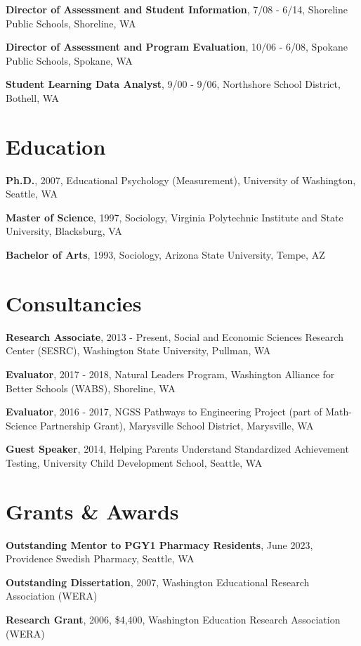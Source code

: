 \documentclass[
  letterpaper,
]{article}
\begin{document}
\textbf{Director of Assessment and Student Information}, 7/08 - 6/14,
Shoreline Public Schools, Shoreline, WA

\textbf{Director of Assessment and Program Evaluation}, 10/06 - 6/08,
Spokane Public Schools, Spokane, WA

\textbf{Student Learning Data Analyst}, 9/00 - 9/06, Northshore School
District, Bothell, WA

\section{Education}\label{education}

\textbf{Ph.D.}, 2007, Educational Psychology (Measurement), University
of Washington, Seattle, WA

\textbf{Master of Science}, 1997, Sociology, Virginia Polytechnic
Institute and State University, Blacksburg, VA

\textbf{Bachelor of Arts}, 1993, Sociology, Arizona State University,
Tempe, AZ

\section{Consultancies}\label{consultancies}

\textbf{Research Associate}, 2013 - Present, Social and Economic
Sciences Research Center (SESRC), Washington State University, Pullman,
WA

\textbf{Evaluator}, 2017 - 2018, Natural Leaders Program, Washington
Alliance for Better Schools (WABS), Shoreline, WA

\textbf{Evaluator}, 2016 - 2017, NGSS Pathways to Engineering Project
(part of Math-Science Partnership Grant), Marysville School District,
Marysville, WA

\textbf{Guest Speaker}, 2014, Helping Parents Understand Standardized
Achievement Testing, University Child Development School, Seattle, WA

\section{Grants \& Awards}\label{grants-awards}

\textbf{Outstanding Mentor to PGY1 Pharmacy Residents}, June 2023,
Providence Swedish Pharmacy, Seattle, WA

\textbf{Outstanding Dissertation}, 2007, Washington Educational Research
Association (WERA)

\textbf{Research Grant}, 2006, \$4,400, Washington Education Research
Association (WERA)
\end{document}
